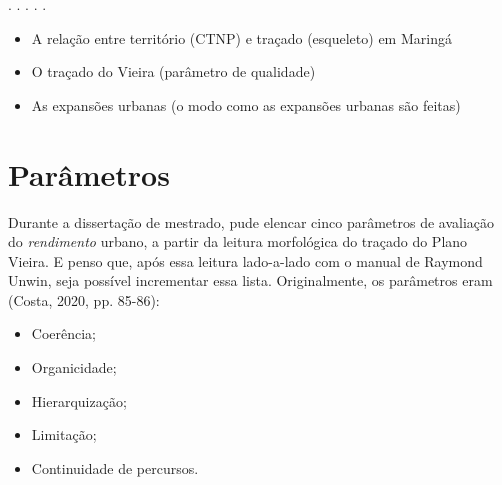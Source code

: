 \documentclass[12pt, a4paper]{book} %
\begin{document}
        \begin{center}
            . . . . .
        \end{center} 


        \begin{itemize} %
            \item A relação entre território (CTNP) e traçado (esqueleto) em Maringá
            \item O traçado do Vieira (parâmetro de qualidade)
            \item As expansões urbanas (o modo como as expansões urbanas são feitas)
        \end{itemize}

            \section{Parâmetros}

        Durante a dissertação de mestrado, pude elencar cinco parâmetros de avaliação do \textit{rendimento} urbano, a partir da leitura morfológica do traçado do Plano Vieira. E penso que, após essa leitura lado-a-lado com o manual de Raymond Unwin, seja possível incrementar essa lista. Originalmente, os parâmetros eram (Costa, 2020, pp. 85-86):

        \begin{itemize}
            \item Coerência;
            \item Organicidade;
            \item Hierarquização;
            \item Limitação;
            \item Continuidade de percursos.
        \end{itemize}
\end{document}
